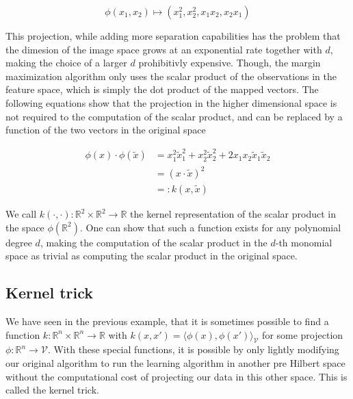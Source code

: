 \begin{equation*}
    \phi(x_1, x_2) \mapsto (x_1^2, x_2^2, x_1x_2, x_2x_1)
\end{equation*}

This projection, while adding more separation capabilities has the problem that the dimesion of the image space grows at an exponential rate together with $d$, making the choice of a larger $d$ prohibitivly expensive. Though, the margin maximization algorithm only uses the scalar product of the observations in the feature space, which is simply the dot product of the mapped vectors. The following equations show that the projection in the higher dimensional space is not required to the computation of the scalar product, and can be replaced by a function of the two vectors in the original space

\begin{equation*}
  \begin{aligned}
    \phi(x) \cdot \phi(\tilde{x})
    &= x_1^2\tilde{x}_1^2 + x_2^2\tilde{x}_2^2 + 2x_1x_2\tilde{x}_1\tilde{x}_2\\
    &= \left(x \cdot \tilde{x}\right)^2 \\
    &=: k(x, \tilde{x})
  \end{aligned}
\end{equation*}

We call $k(\cdot, \cdot) : \mathbb{R}^2 \times \mathbb{R}^2 \rightarrow \mathbb{R}$ the kernel representation of the scalar product in the space $\phi(\mathbb{R}^2)$. One can show that such a function exists for any polynomial degree $d$, making the computation of the scalar product in the $d$-th monomial space as trivial as computing the scalar product in the original space.

\subsection{Kernel trick}

We have seen in the previous example, that it is sometimes possible to find a function $k :\mathbb{R}^n \times \mathbb{R}^n \rightarrow \mathbb{R}$ with $k(x, x') = \langle \phi(x), \phi(x')\rangle _{\mathcal{V}}$ for some projection $\phi : \mathbb{R}^n \rightarrow \mathcal{V}$. With these special functions, it is possible by only lightly modifying our original algorithm to run the learning algorithm in another pre Hilbert space without the computational cost of projecting our data in this other space. This is called the kernel trick.

